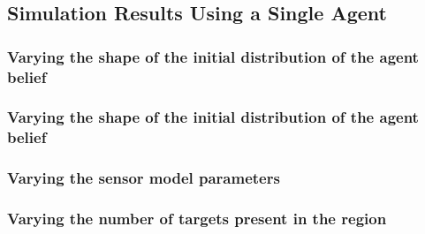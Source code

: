\subsection{Simulation Results Using a Single Agent}\label{subsec:SingleAgentSingleSourceResults}

\subsubsection{Varying the shape of the initial distribution of the agent belief}\label{subsubsec:VaryingPrior}

\break

\subsubsection{Varying the shape of the initial distribution of the agent belief}\label{subsubsec:VaryingPrior}

\break


\subsubsection{Varying the sensor model parameters}\label{subsubsec:MicalibratedSensor}

\break

\subsubsection{Varying the number of targets present in the region}\label{subsubsec:VaryingNoTargets}

\break


\break